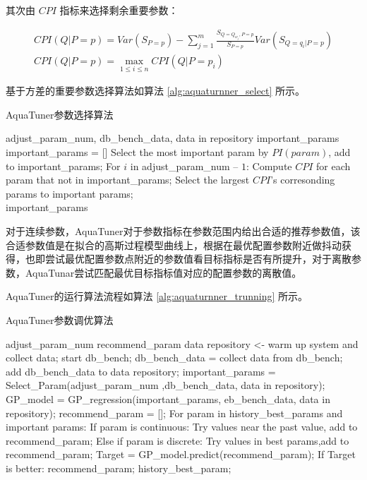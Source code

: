 其次由 $CPI$ 指标来选择剩余重要参数：

\begin{equation}
  \label{eq:cpi}
  \begin{aligned}
    CPI(Q|P=p) = Var(S_{P=p})-\sum_{j=1}^{m}\frac{S_{Q=Q_{w_j},P=p}}{S_{P=p}}Var(S_{Q=q_i|P=p})\\
    CPI(Q|P=p) = \max_{1\le i\le n}CPI(Q|P=p_i)
  \end{aligned}
\end{equation}

基于方差的重要参数选择算法如算法 \ref{alg:aquaturnner_select} 所示。

\begin{algorithm}[htb]
  \caption{ AquaTuner参数选择算法 }
  \label{alg:aquaturnner_select}
  \begin{algorithmic}[1]
    \Require
      adjust\_param\_num, db\_bench\_data, data in repository
    \Ensure
      important\_params
    \State important\_params = []
    \State Select the most important param by $PI(param)$, add to important\_params;
    \State For $i$ in adjust\_param\_num $–$ $1$:
    \State \qquad Compute $CPI$ for each param that not in important\_params;
    \State \qquad Select the largest $CPI$’s corresonding params to important params; \\
    \Return important\_params
  \end{algorithmic}
\end{algorithm}

对于连续参数，AquaTuner对于参数指标在参数范围内给出合适的推荐参数值，该合适参数值是在拟合的高斯过程模型曲线上，根据在最优配置参数附近做抖动获得，也即尝试最优配置参数点附近的参数值看目标指标是否有所提升，对于离散参数，AquaTunar尝试匹配最优目标指标值对应的配置参数的离散值。

AquaTuner的运行算法流程如算法 \ref{alg:aquaturnner_trunning} 所示。

\begin{algorithm}[htb]
  \caption{ AquaTuner参数调优算法 }
  \label{alg:aquaturnner_trunning}
  \begin{algorithmic}[2]
    \Require
      adjust\_param\_num
    \Ensure
      recommend\_param
    \State data repository <- warm up system and collect data;
    \State start db\_bench;
    \State db\_bench\_data = collect data from db\_bench;
    \State add db\_bench\_data to data repository;
    \State important\_params = Select\_Param(adjust\_param\_num ,db\_bench\_data, data in repository);
    \State GP\_model = GP\_regression(important\_params, eb\_bench\_data, data in repository);
    \State recommend\_param = [];
    \State For param in  history\_best\_params and important params:
    \State \qquad If param is continuous:
    \State \qquad \qquad Try values near the past value, add to recommend\_param;
    \State \qquad Else if param is discrete:
    \State \qquad \qquad Try values in best params,add to recommend\_param;
    \State Target = GP\_model.predict(recommend\_param);
    \State If Target is better:
    \State \qquad \Return recommend\_param;
    \State \Return history\_best\_param;
  \end{algorithmic}
\end{algorithm}
